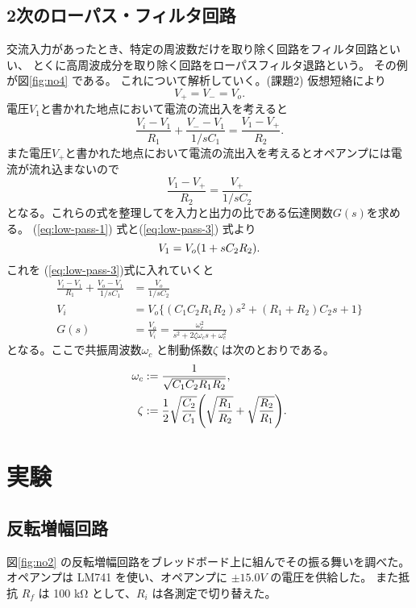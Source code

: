 \documentclass[11pt,dvipdfmx,a4paper]{jsarticle}
\begin{document}
\subsection{2次のローパス・フィルタ回路}
交流入力があったとき、特定の周波数だけを取り除く回路をフィルタ回路といい、
とくに高周波成分を取り除く回路をローパスフィルタ退路という。
その例が図\ref{fig:no4} である。
これについて解析していく。(課題2)
仮想短絡により
\begin{equation}
	V_{+} = V_{-} = V_o. \label{eq:low-pass-1}
\end{equation}
電圧\(V_1\)と書かれた地点において電流の流出入を考えると
\begin{equation}
	\frac{V_i-V_1}{R_1}+\frac{V_{-}-V_1}{1/sC_1} = \frac{V_1-V_{+}}{R_2} \label{eq:low-pass-2}.
\end{equation}
また電圧\(V_{+}\)と書かれた地点において電流の流出入を考えるとオペアンプには電流が流れ込まないので
\begin{equation}
	\frac{V_1-V_{+}}{R_2} = \frac{V_{+}}{1/sC_2} \label{eq:low-pass-3}
\end{equation}
となる。これらの式を整理してを入力と出力の比である伝達関数\(G(s)\)を求める。
(\ref{eq:low-pass-1}) 式と(\ref{eq:low-pass-3}) 式より
\begin{equation}
	V_1 = V_o \qty(1+sC_2 R_2).
\end{equation}
これを (\ref{eq:low-pass-3})式に入れていくと
\begin{align}
	\frac{V_i-V_1}{R_1}+\frac{V_{o}-V_1}{1/sC_1} &= \frac{V_{o}}{1/sC_2}\\
	V_i &= V_o \biggl\{(C_1C_2R_1R_2)s^2+(R_1+R_2)C_2s+1\biggr\}\\
	G(s) &= \frac{V_o}{V_i} = \frac{\omega_c^2}{s^2+2\zeta\omega_c s+\omega_c^2}
\end{align}
となる。ここで共振周波数\(\omega_c\) と制動係数\(\zeta\) は次のとおりである。
\begin{align}
	\omega_c &:= \frac{1}{\sqrt{C_1C_2R_1R_2}},\\
	\zeta &:= \frac{1}{2}\sqrt{\frac{C_2}{C_1}}\qty(\sqrt{\frac{R_1}{R_2}}+\sqrt{\frac{R_2}{R_1}}).
\end{align}


\section{実験}
\subsection{反転増幅回路}
図\ref{fig:no2} の反転増幅回路をブレッドボード上に組んでその振る舞いを調べた。
オペアンプは LM741 を使い、オペアンプに \(\pm 15.0 V\) の電圧を供給した。
また抵抗 \(R_f\) は 100 k\si{\ohm} として、\(R_i\) は各測定で切り替えた。
\end{document}
